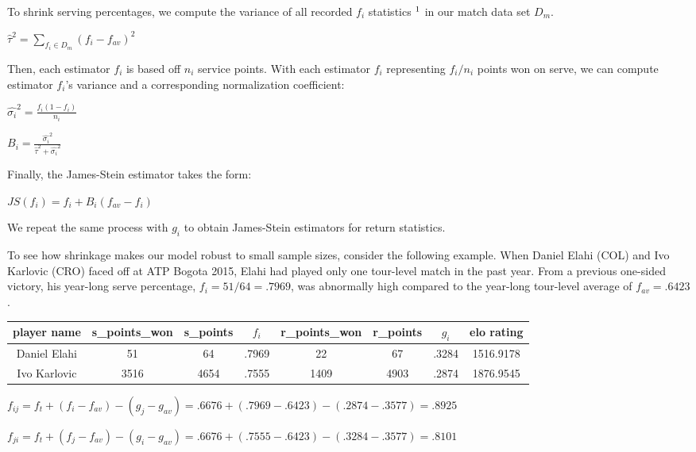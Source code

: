 \documentclass[chapterprefix=false]{report}
\begin{document}
To shrink serving percentages, we compute the variance of all recorded $f_i$ statistics $\footnote{each ${f_i}$ is computed from the previous twelve months of player data}$ in our match data set $D_m$.

$\hat{\tau}^2 = \sum_{f_i \in D_m} (f_i-f_{av})^2$

Then, each estimator $f_i$ is based off $n_i$ service points. With each estimator $f_i$ representing $f_i/n_i$ points won on serve, we can compute estimator $f_i$'s variance and a corresponding normalization coefficient:

\begin{center}
\large{$\hat{\sigma_i}^2 = \frac{f_i(1-f_i)}{n_i}$}

\large{$B_i = \frac{\hat{\sigma_i}^2}{\hat{\tau}^2+\hat{\sigma_i}^2}$}
\end{center}

Finally, the James-Stein estimator takes the form: 

\begin{center}
$JS(f_i) = f_i + B_i(f_{av}-f_i)$
\end{center}

We repeat the same process with $g_i$ to obtain James-Stein estimators for return statistics.

To see how shrinkage makes our model robust to small sample sizes, consider the following example. When Daniel Elahi (COL) and Ivo Karlovic (CRO) faced off at ATP Bogota 2015, Elahi had played only one tour-level match in the past year. From a previous one-sided victory, his year-long serve percentage, $f_i=51/64=.7969$, was abnormally high compared to the year-long tour-level average of $f_{av}=.6423$. 


\begin{center}
\begin{tabular}{ |c|c|c|c|c|c|c|c| } 
 \hline
 player name & s\_points\_won & s\_points
 & $f_i$ & r\_points\_won & r\_points & $g_i$ & elo rating \\ 
 \hline
 Daniel Elahi & 51 & 64 & .7969 & 22 & 67 & .3284 & 1516.9178 
 \\
 \hline
 Ivo Karlovic & 3516 & 4654 & .7555 & 1409 & 4903 & .2874 & 1876.9545 \\ 
 \hline
\end{tabular}
\end{center}

\begin{center}
$f_{ij} = f_t + (f_i-f_{av})-(g_j-g_{av}) = .6676 + (.7969-.6423) - (.2874-.3577) = .8925$

$f_{ji} = f_t + (f_j-f_{av})-(g_i-g_{av}) = .6676 + (.7555-.6423) - (.3284-.3577) = .8101$
\end{center}
\end{document}

